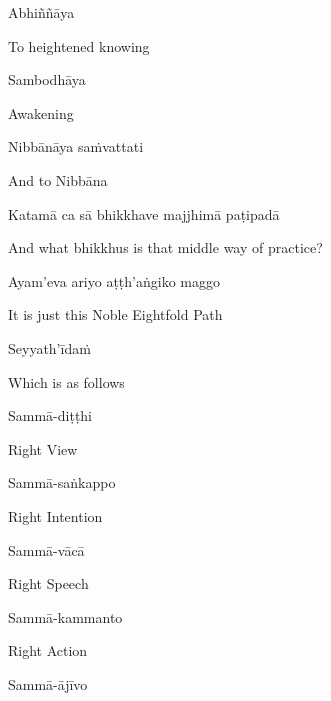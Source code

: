 Abhiññāya

\begin{english}
  To heightened knowing
\end{english}

Sambodhāya

\begin{english}
  Awakening
\end{english}

Nibbānāya saṁvattati

\begin{english}
  And to Nibbāna
\end{english}

Katamā ca sā bhikkhave majjhimā paṭipadā

\begin{english}
  And what bhikkhus is that middle way of practice?
\end{english}

Ayam'eva ariyo aṭṭh'aṅgiko maggo

\begin{english}
  It is just this Noble Eightfold Path\ifdigitalversion\makeatletter\hyperlink{endnote51-appendix}\makeatother\fi
\end{english}

Seyyath'īdaṁ

\begin{english}
  Which is as follows
\end{english}

Sammā-diṭṭhi

\begin{english}
  Right View
\end{english}

Sammā-saṅkappo

\begin{english}
  Right Intention
\end{english}

Sammā-vācā

\begin{english}
  Right Speech
\end{english}

Sammā-kammanto

\begin{english}
  Right Action
\end{english}

Sammā-ājīvo

